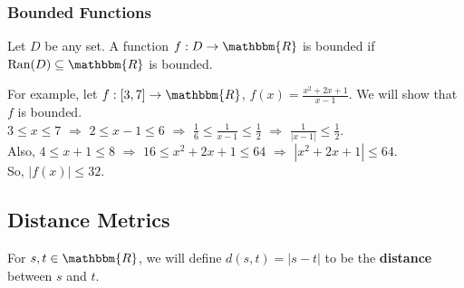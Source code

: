 \documentclass[10pt]{extarticle}
\newcommand{\ran}{\text{Ran}}
\newcommand{\R}{\mathbbm{R}}
\begin{document}
    \subsubsection{Bounded Functions}%
      Let $D$ be any set. A function $f: D\rightarrow \R$ is bounded if $\ran(D)\subseteq \R$ is bounded.
    
      For example, let $f: [3,7] \rightarrow \R$, $f(x) = \frac{x^2 + 2x + 1}{x-1}$. We will show that $f$ is bounded.\\

      $3\leq x \leq 7$ $\Rightarrow$ $2 \leq x-1 \leq 6$ $\Rightarrow$ $\frac{1}{6} \leq \frac{1}{x-1} \leq \frac{1}{2}$ $\Rightarrow$ $\frac{1}{|x-1|} \leq \frac{1}{2}$.\\

      Also, $4 \leq x+1 \leq 8$ $\Rightarrow$ $16 \leq x^2 + 2x + 1 \leq 64$ $\Rightarrow$ $|x^2 + 2x + 1| \leq 64$.\\

      So, $|f(x)| \leq 32$.
  \subsection{Distance Metrics}%
    For $s,t\in\R$, we will define $d(s,t) = |s-t|$ to be the \textbf{distance} between $s$ and $t$.
\end{document}
